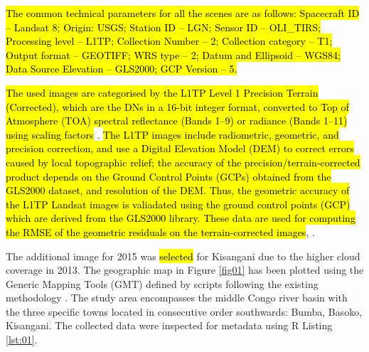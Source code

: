 \documentclass[applsci,article,submit,pdftex,moreauthors]{Definitions/mdpi}
\begin{document}
\hl{The common technical parameters for all the scenes are as follows: Spacecraft ID -- Landsat 8; Origin: USGS; Station ID -- LGN; Sensor ID -- OLI\_TIRS; Processing level -- L1TP; Collection Number -- 2; Collection category -- T1;  Output format -- GEOTIFF; WRS type -- 2; Datum and Ellipsoid -- WGS84; Data Source Elevation -- GLS2000; GCP Version -- 5.}

\hl{The used images are categorised by the L1TP Level 1 Precision Terrain (Corrected), which are the DNs in a 16-bit integer format, converted to Top of Atmosphere (TOA) spectral reflectance (Bands 1--9) or radiance (Bands 1--11) using scaling factors} \cite{Engebretson}. \hl{The L1TP images include radiometric, geometric, and precision correction, and use a Digital Elevation Model (DEM) to correct errors caused by local topographic relief; the accuracy of the precision/terrain-corrected product depends on the Ground Control Points (GCPs) obtained from the GLS2000 dataset, and resolution of the DEM. Thus, the geometric accuracy of the L1TP Landsat images is valiadated using the ground control points (GCP) which are derived from the GLS2000 library. These data are used for computing the RMSE of the geometric residuals on the terrain-corrected images}, \cite{Engebretson}. 

The additional image for 2015 was \hl{selected} for Kisangani due to the higher cloud coverage in 2013. The geographic map in Figure \ref{fig01} has been plotted using the Generic Mapping Tools (GMT) defined by scripts following the existing methodology \cite{Lemenkova202212,Lemenkova202217,Lemenkova2022b}. The study area encompasses the middle Congo river basin with the three specific towns located in consecutive order southwards: Bumba, Basoko, Kisangani. The collected data were inspected for metadata using\hl{ }R Listing \ref{lst:01}. 
\end{document}

